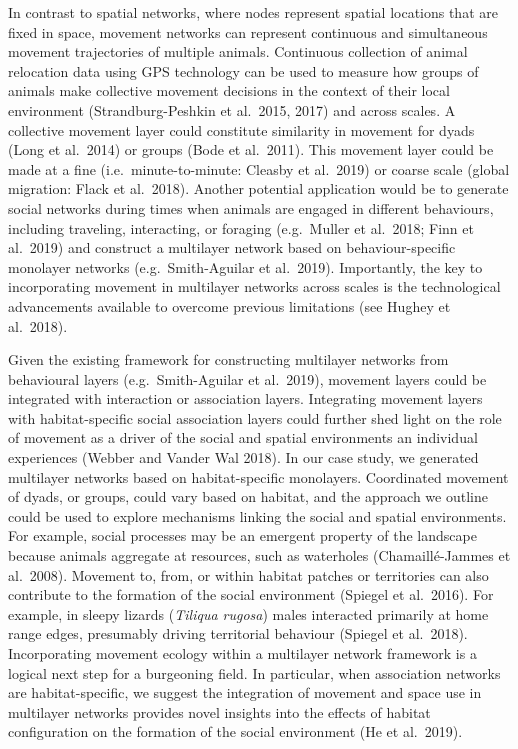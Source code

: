 \documentclass[]{article}
\begin{document}
In contrast to spatial networks, where nodes represent spatial locations that
are fixed in space, movement networks can represent continuous and simultaneous
movement trajectories of multiple animals. Continuous collection of animal
relocation data using GPS technology can be used to measure how groups of
animals make collective movement decisions in the context of their local
environment (Strandburg-Peshkin et al.~2015, 2017) and across scales. A
collective movement layer could constitute similarity in movement for dyads
(Long et al.~2014) or groups (Bode et al.~2011). This movement layer could be
made at a fine (i.e.~minute-to-minute: Cleasby et al.~2019) or coarse scale
(global migration: Flack et al.~2018). Another potential application would be to
generate social networks during times when animals are engaged in different
behaviours, including traveling, interacting, or foraging (e.g.~Muller et
al.~2018; Finn et al.~2019) and construct a multilayer network based on
behaviour-specific monolayer networks (e.g.~Smith-Aguilar et al.~2019).
Importantly, the key to incorporating movement in multilayer networks across
scales is the technological advancements available to overcome previous
limitations (see Hughey et al.~2018).

Given the existing framework for constructing multilayer networks from
behavioural layers (e.g.~Smith-Aguilar et al.~2019), movement layers could be
integrated with interaction or association layers. Integrating movement layers
with habitat-specific social association layers could further shed light on the
role of movement as a driver of the social and spatial environments an
individual experiences (Webber and Vander Wal 2018). In our case study, we
generated multilayer networks based on habitat-specific monolayers. Coordinated
movement of dyads, or groups, could vary based on habitat, and the approach we
outline could be used to explore mechanisms linking the social and spatial
environments. For example, social processes may be an emergent property of the
landscape because animals aggregate at resources, such as waterholes
(Chamaillé-Jammes et al.~2008). Movement to, from, or within habitat patches or
territories can also contribute to the formation of the social environment
(Spiegel et al.~2016). For example, in sleepy lizards (\emph{Tiliqua rugosa}) males
interacted primarily at home range edges, presumably driving territorial
behaviour (Spiegel et al.~2018). Incorporating movement ecology within a
multilayer network framework is a logical next step for a burgeoning field. In
particular, when association networks are habitat-specific, we suggest the
integration of movement and space use in multilayer networks provides novel
insights into the effects of habitat configuration on the formation of the
social environment (He et al.~2019).
\end{document}
